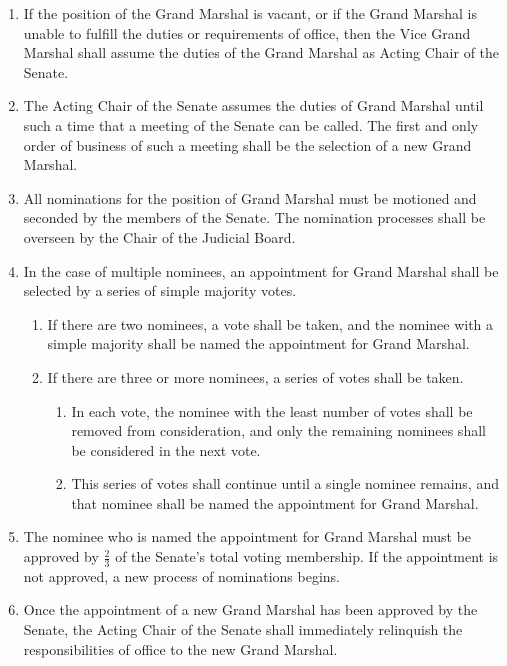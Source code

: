 \begin{enumerate}
    \item If the position of the Grand Marshal is vacant, or if the Grand Marshal is unable to fulfill the duties or requirements of office, then the Vice Grand Marshal shall assume the duties of the Grand Marshal as Acting Chair of the Senate.

    \item The Acting Chair of the Senate assumes the duties of Grand Marshal until such a time that a meeting of the Senate can be
    called. The first and only order of business of such a meeting shall be the selection of a new Grand Marshal.

    \item All nominations for the position of Grand Marshal must be motioned and seconded by the members of the Senate. The
    nomination processes shall be overseen by the Chair of the Judicial Board.

    \item In the case of multiple nominees, an appointment for Grand Marshal shall be selected by a series of simple majority votes.
    \begin{enumerate}
        \item If there are two nominees, a vote shall be taken, and the nominee with a simple majority shall be named the appointment
        for Grand Marshal.

        \item If there are three or more nominees, a series of votes shall be taken.
        \begin{enumerate}
            \item In each vote, the nominee with the least number of votes shall be removed from consideration, and only the remaining
            nominees shall be considered in the next vote.

            \item This series of votes shall continue until a single nominee remains, and that nominee shall be named the appointment for
            Grand Marshal.
        \end{enumerate}
    \end{enumerate}

    \item The nominee who is named the appointment for Grand Marshal must be approved by $\frac{2}{3}$ of the Senate’s total voting membership. If the appointment is not approved, a new process of nominations begins.
    \item Once the appointment of a new Grand Marshal has been approved by the Senate, the Acting Chair of the Senate shall immediately relinquish the responsibilities of office to the new Grand Marshal.

\end{enumerate}
